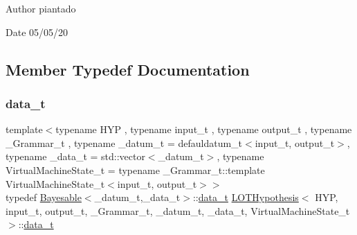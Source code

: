 \begin{DoxyAuthor}{Author}
piantado 
\end{DoxyAuthor}
\begin{DoxyDate}{Date}
05/05/20 
\end{DoxyDate}


\subsection{Member Typedef Documentation}
\mbox{\label{class_l_o_t_hypothesis_abd9c848100dfaaf2870f5dfa9ea91c65}} 
\subsubsection{\texorpdfstring{data\+\_\+t}{data\_t}}
{\footnotesize\ttfamily template$<$typename H\+YP , typename input\+\_\+t , typename output\+\_\+t , typename \+\_\+\+Grammar\+\_\+t , typename \+\_\+datum\+\_\+t  = defauldatum\+\_\+t$<$input\+\_\+t, output\+\_\+t$>$, typename \+\_\+data\+\_\+t  = std\+::vector$<$\+\_\+datum\+\_\+t$>$, typename Virtual\+Machine\+State\+\_\+t  = typename \+\_\+\+Grammar\+\_\+t\+::template Virtual\+Machine\+State\+\_\+t$<$input\+\_\+t, output\+\_\+t$>$$>$ \\
typedef \hyperlink{class_bayesable}{Bayesable}$<$\+\_\+datum\+\_\+t,\+\_\+data\+\_\+t$>$\+::\hyperlink{class_l_o_t_hypothesis_abd9c848100dfaaf2870f5dfa9ea91c65}{data\+\_\+t} \hyperlink{class_l_o_t_hypothesis}{L\+O\+T\+Hypothesis}$<$ H\+YP, input\+\_\+t, output\+\_\+t, \+\_\+\+Grammar\+\_\+t, \+\_\+datum\+\_\+t, \+\_\+data\+\_\+t, Virtual\+Machine\+State\+\_\+t $>$\+::\hyperlink{class_l_o_t_hypothesis_abd9c848100dfaaf2870f5dfa9ea91c65}{data\+\_\+t}}

\mbox{\label{class_l_o_t_hypothesis_ae36b1f113f45ee5ac82660028672739b}} 
